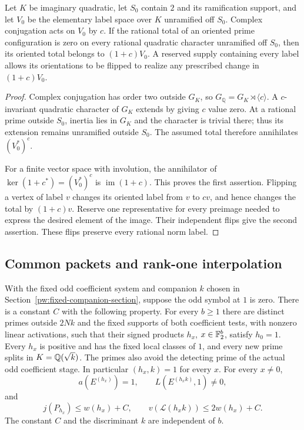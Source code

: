 \begin{lemma}\label{pw:coinvariants}
Let $K$ be imaginary quadratic, let $S_0$ contain $2$ and its ramification
support, and let $V_0$ be the elementary label space over $K$ unramified
off $S_0$.  Complex conjugation acts on $V_0$ by $c$.  If the rational
total of an oriented prime configuration is zero on every rational
quadratic character unramified off $S_0$, then its oriented total belongs
to $(1+c)V_0$.  A reserved supply containing every label allows its
orientations to be flipped to realize any prescribed change in
$(1+c)V_0$.
\end{lemma}

\begin{proof}
Complex conjugation has order two outside $G_K$, so
$G_{\mathbb Q}=G_K\rtimes\langle c\rangle$.  A $c$-invariant quadratic
character of $G_K$ extends by giving $c$ value zero.  At a rational prime
outside $S_0$, inertia lies in $G_K$ and the character is trivial there;
thus its extension remains unramified outside $S_0$.  The assumed total
therefore annihilates $(V_0^*)^c$.

For a finite vector space with involution, the annihilator of
$\ker(1+c^*)=(V_0^*)^c$ is $\operatorname{im}(1+c)$.  This proves the
first assertion.  Flipping a vertex of label $v$ changes its oriented
label from $v$ to $cv$, and hence changes the total by $(1+c)v$.
Reserve one representative for every preimage needed to express the
desired element of the image.  Their independent flips give the second
assertion.  These flips preserve every rational norm label.
\end{proof}

\subsection{Common packets and rank-one interpolation}
\label{pw:assembly-section}

\begin{proposition}
\label{pw:fixed-companion-families}
With the fixed odd coefficient system and companion $k$ chosen in
Section~\ref{pw:fixed-companion-section}, suppose the odd symbol at $1$
is zero. There is a constant $C$ with the following property. For every $b\ge1$ there are distinct primes outside
$2Nk$ and the fixed supports of both coefficient tests, with nonzero
linear activations, such that their signed products $h_x$,
$x\in\mathbb F_2^b$, satisfy $h_0=1$. Every $h_x$ is positive and has the fixed
local classes of $1$, and every new prime splits in $K=\mathbb Q(\sqrt{k})$.
The primes also avoid the detecting prime of the actual odd coefficient
stage. In particular $(h_x,k)=1$ for every $x$. For every $x\ne0$,
\[
 a(E^{(h_x)})=1,\qquad L(E^{(h_xk)},1)\ne0,
\]
and
\[
 j(P_{h_x})\le w(h_x)+C,\qquad
 v(\mathcal L(h_xk))\le 2w(h_x)+C.
\]
The constant $C$ and the discriminant $k$ are independent of $b$.
\end{proposition}

